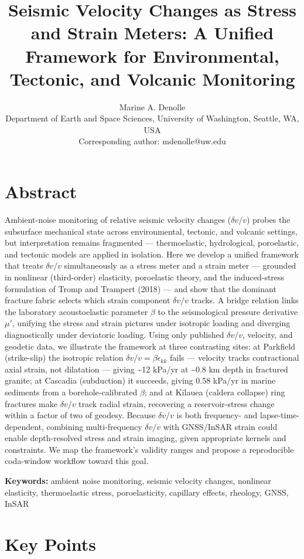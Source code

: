 \documentclass[12pt]{article}
\title{\textbf{Seismic Velocity Changes as Stress and Strain Meters: A
Unified Framework for Environmental, Tectonic, and Volcanic Monitoring}}
\author{Marine A. Denolle\\
\small Department of Earth and Space Sciences, University of Washington,
Seattle, WA, USA\\
\small Corresponding author: mdenolle@uw.edu}
\date{}
\begin{document}
\maketitle
\linenumbers

\section{Abstract}\label{abstract}

Ambient-noise monitoring of relative seismic velocity changes
(\(\delta v/v\)) probes the subsurface mechanical state across
environmental, tectonic, and volcanic settings, but interpretation
remains fragmented --- thermoelastic, hydrological, poroelastic, and
tectonic models are applied in isolation. Here we develop a unified
framework that treats \(\delta v/v\) simultaneously as a stress meter
and a strain meter --- grounded in nonlinear (third-order) elasticity,
poroelastic theory, and the induced-stress formulation of Tromp and
Trampert (2018) --- and show that the dominant fracture fabric selects
which strain component \(\delta v/v\) tracks. A bridge relation links
the laboratory acoustoelastic parameter \(\beta\) to the seismological
pressure derivative \(\mu'\), unifying the stress and strain pictures
under isotropic loading and diverging diagnostically under deviatoric
loading. Using only published \(\delta v/v\), velocity, and geodetic
data, we illustrate the framework at three contrasting sites: at
Parkfield (strike-slip) the isotropic relation
\(\delta v/v = \beta\epsilon_{kk}\) fails --- velocity tracks
contractional axial strain, not dilatation --- giving \textasciitilde12
kPa/yr at \textasciitilde0.8 km depth in fractured granite; at Cascadia
(subduction) it succeeds, giving 0.58 kPa/yr in marine sediments from a
borehole-calibrated \(\beta\); and at Kīlauea (caldera collapse) ring
fractures make \(\delta v/v\) track radial strain, recovering a
reservoir-stress change within a factor of two of geodesy. Because
\(\delta v/v\) is both frequency- and lapse-time-dependent, combining
multi-frequency \(\delta v/v\) with GNSS/InSAR strain could enable
depth-resolved stress and strain imaging, given appropriate kernels and
constraints. We map the framework's validity ranges and propose a
reproducible coda-window workflow toward this goal.

\textbf{Keywords:} ambient noise monitoring, seismic velocity changes,
nonlinear elasticity, thermoelastic stress, poroelasticity, capillary
effects, rheology, GNSS, InSAR

\section{Key Points}\label{key-points}
\end{document}
